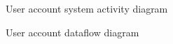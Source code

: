﻿\documentclass{article}
\begin{document}
\begin{figure}[H]
    \centering
    \begin{center}
    \end{center}
    \caption{User account system activity diagram}
    \label{fig:my_label}
\end{figure}

\begin{figure}[H]
    \centering
    \begin{center}
    \end{center}
    \caption{User account dataflow diagram}
    \label{fig:my_label}
\end{figure}
\end{document}
